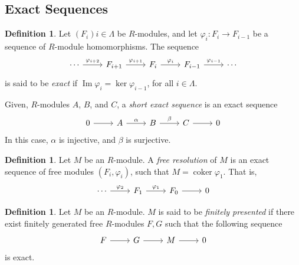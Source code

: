 \documentclass{amsart}
\theoremstyle{definition}
\newtheorem{definition}[theorem]{Definition}
\theoremstyle{remark}
\DeclareMathOperator{\Ima}{Im}
\DeclareMathOperator{\coker}{coker}
\numberwithin{equation}{section}
\begin{document}
\subsection{Exact Sequences}

\begin{definition}
  Let $(F_i){i \in \Lambda}$ be $R$-modules, and let $\varphi_i: F_{i} \to F_{i-1}$ be a sequence of $R$-module homomorphisms. The sequence
  \begin{equation*}
    \begin{tikzcd}
      \cdots \arrow[r]{}{\varphi_{i+2}} & F_{i+1} \arrow[r]{}{\varphi_{i+1}} & F_{i} \arrow[r]{}{\varphi_{i}} & F_{i-1} \arrow[r]{}{\varphi_{i-1}} & \cdots
    \end{tikzcd}
  \end{equation*}
  is said to be \emph{exact} if $\Ima \varphi_{i} = \ker \varphi_{i-1}$, for all $i \in \Lambda$.

  Given, $R$-modules $A$, $B$, and $C$, a \emph{short exact sequence} is an exact sequence
  \begin{equation*}
    \begin{tikzcd}
      0 \arrow[r] & A \arrow[r]{}{\alpha} & B \arrow[r]{}{\beta} & C \arrow[r] & 0
    \end{tikzcd}
  \end{equation*}
  In this case, $\alpha$ is injective, and $\beta$ is surjective.
\end{definition}

\begin{definition}
  Let $M$ be an $R$-module. A \emph{free resolution} of $M$ is an exact sequence of free modules $(F_{i}, \varphi_{i})$, such that $M = \coker \varphi_{1}$. That is,
  \begin{equation*}
    \begin{tikzcd}
      \cdots \arrow[r]{}{\varphi_{2}} & F_1 \arrow[r]{}{\varphi_{1}} & F_0 \arrow[r] & 0 
    \end{tikzcd}
  \end{equation*}
\end{definition}

\begin{definition}
  Let $M$ be an $R$-module. $M$ is said to be \emph{finitely presented} if there exist finitely generated free $R$-modules $F, G$ such that the following sequence
  \begin{equation*}
    \begin{tikzcd}
      F \arrow[r] & G \arrow[r] & M \arrow[r] & 0
    \end{tikzcd}
  \end{equation*}
  is exact.
\end{definition}
\end{document}
